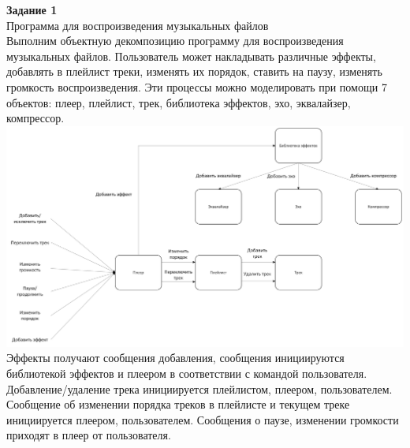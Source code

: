 \documentclass[a4paper,14pt]{extarticle}
\begin{document}
\textbf{Задание 1}\\
Программа для воспроизведения музыкальных файлов\\
Выполним объектную декомпозицию программу для воспроизведения музыкальных файлов. 
Пользователь может накладывать различные эффекты, добавлять в плейлист треки, изменять их порядок, 
ставить на паузу, изменять громкость воспроизведения.
Эти процессы можно моделировать при помощи 7 объектов: 
плеер, плейлист, трек, библиотека эффектов, эхо, эквалайзер, компрессор.\\
\includegraphics[width=190mm]{task1}\\
Эффекты получают сообщения добавления, сообщения инициируются библиотекой эффектов и плеером
в соответствии с командой пользователя. Добавление/удаление трека инициируется плейлистом, плеером, 
пользователем. Сообщение об изменении порядка треков в плейлисте и текущем треке инициируется плеером, 
пользователем. Сообщения о паузе, изменении громкости приходят в плеер от пользователя.\\
\end{document}
